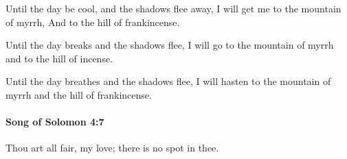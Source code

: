			\begin{versebox}
					\item[BHS] 
					\item[LXX] 
					\item[ASV] Until the day be cool, and the shadows flee away, I will get me to the mountain of myrrh, And to the hill of frankincense.
					\item[NIV] Until the day breaks and the shadows flee, I will go to the mountain of myrrh and to the hill of incense.
					\item[NRSV] Until the day breathes and the shadows flee, I will hasten to the mountain of myrrh and the hill of frankincense.
			\end{versebox}

		\paragraph{Song of Solomon 4:7} %
			\label{SONGOFSOLOMON-4-7}

			Thou art all fair, my love; there is no spot in thee.

